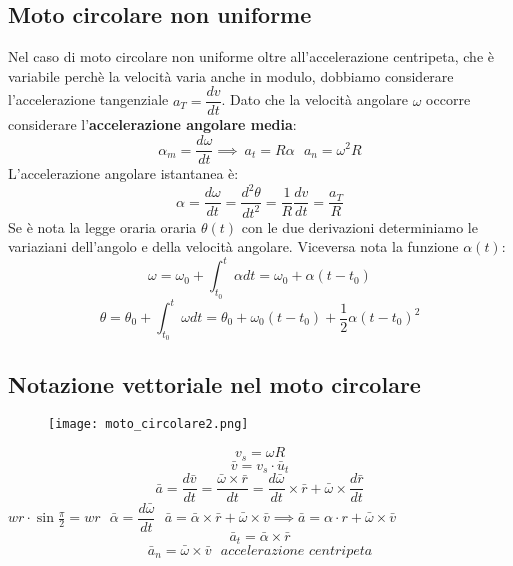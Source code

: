 \documentclass[../../main.tex]{subfiles}
\begin{document}
\subsection{Moto circolare non uniforme}
Nel caso di moto circolare non uniforme oltre all'accelerazione centripeta, che è variabile perchè la velocità varia anche in modulo, dobbiamo considerare l'accelerazione tangenziale $a_T = \dfrac{dv}{dt}$. Dato che la velocità angolare $\omega$ occorre considerare l'\textbf{accelerazione angolare media}:
\[
    \alpha_m = \dfrac{d\omega}{dt} \implies \ a_t = R\alpha \ \ \ a_n = \omega^2R
\]
L'accelerazione angolare istantanea è:
\[
    \alpha = \dfrac{d\omega}{dt} = \dfrac{d^2\theta}{dt^2} = \dfrac{1}{R}\dfrac{dv}{dt} = \dfrac{a_T}{R}
\]
Se è nota la legge oraria oraria $\theta(t)$ con le due derivazioni determiniamo le variaziani dell'angolo e della velocità angolare. Viceversa nota la funzione $\alpha(t)$:
\[
    \omega = \omega_0 + \int_{t_0}^{t} \alpha dt = \omega_0 + \alpha(t - t_0)
\]
\[
    \theta = \theta_0 + \int_{t_0}^{t} \omega dt = \theta_0 + \omega_0(t - t_0) + \dfrac{1}{2}\alpha(t - t_0)^2
\]
\subsection{Notazione vettoriale nel moto circolare}
\begin{figure}[h!]
    \centering
    \texttt{[image: moto\_circolare2.png]}
\end{figure}
\[
    v_s = \omega R
\]
\[
    \bar{v} = v_s \cdot \bar{u}_t
\]
\[
    \bar a = \dfrac{d\bar v}{dt} = \dfrac{\bar\omega\times\bar r}{dt} = \dfrac{d\bar \omega}{dt}\times\bar r + \bar\omega\times\dfrac{d\bar r}{dt}
\]
$wr\cdot\sin\frac{\pi}{2} = wr \ \ \ \bar\alpha = \dfrac{d\bar\omega}{dt} \ \ \ \bar a = \bar\alpha\times\bar r + \bar\omega\times\bar v \implies \bar a = \alpha\cdot r + \bar\omega\times\bar v$
\[
    \bar a_t = \bar\alpha\times\bar r
\]
\[
    \bar a_n = \bar{\omega}\times\bar v \ \ \ \textit{accelerazione centripeta}
\]
\end{document}
